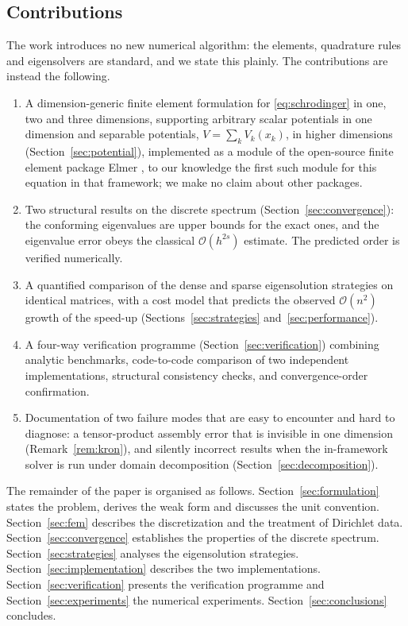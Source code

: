 \documentclass[pdflatex,sn-mathphys-num]{sn-jnl}
\theoremstyle{thmstyleone}%
\theoremstyle{thmstyletwo}%
\theoremstyle{thmstylethree}%
\begin{document}
\subsection*{Contributions}

The work introduces no new numerical algorithm: the elements, quadrature rules
and eigensolvers are standard, and we state this plainly. The contributions are
instead the following.

\begin{enumerate}
  \item A dimension-generic finite element formulation for
        \eqref{eq:schrodinger} in one, two and three dimensions, supporting
        arbitrary scalar potentials in one dimension and separable potentials,
        $V = \sum_k V_k(x_k)$, in higher dimensions
        (Section~\ref{sec:potential}), implemented as a module of the
        open-source finite element package \textsf{Elmer} \cite{elmer2024},
        to our knowledge the first such module for this equation in that
        framework; we make no claim about other packages.
  \item Two structural results on the discrete spectrum
        (Section~\ref{sec:convergence}): the conforming eigenvalues are upper
        bounds for the exact ones, and the eigenvalue error obeys the classical
        $\mathcal{O}(h^{2s})$ estimate. The predicted order is verified
        numerically.
  \item A quantified comparison of the dense and sparse eigensolution strategies on identical
        matrices, with a cost model that predicts the observed
        $\mathcal{O}(n^2)$ growth of the speed-up
        (Sections~\ref{sec:strategies} and~\ref{sec:performance}).
  \item A four-way verification programme (Section~\ref{sec:verification})
        combining analytic benchmarks, code-to-code comparison of two
        independent implementations, structural consistency checks, and
        convergence-order confirmation.
  \item Documentation of two failure modes that are easy to encounter and hard
        to diagnose: a tensor-product assembly error that is invisible in one
        dimension (Remark~\ref{rem:kron}), and silently incorrect results when
        the in-framework solver is run under domain decomposition
        (Section~\ref{sec:decomposition}).
\end{enumerate}

The remainder of the paper is organised as follows.
Section~\ref{sec:formulation} states the problem, derives the weak form and
discusses the unit convention. Section~\ref{sec:fem} describes the
discretization and the treatment of Dirichlet data.
Section~\ref{sec:convergence} establishes the properties of the discrete
spectrum. Section~\ref{sec:strategies} analyses the eigensolution strategies.
Section~\ref{sec:implementation} describes the two implementations.
Section~\ref{sec:verification} presents the verification programme and
Section~\ref{sec:experiments} the numerical experiments.
Section~\ref{sec:conclusions} concludes.
\end{document}
